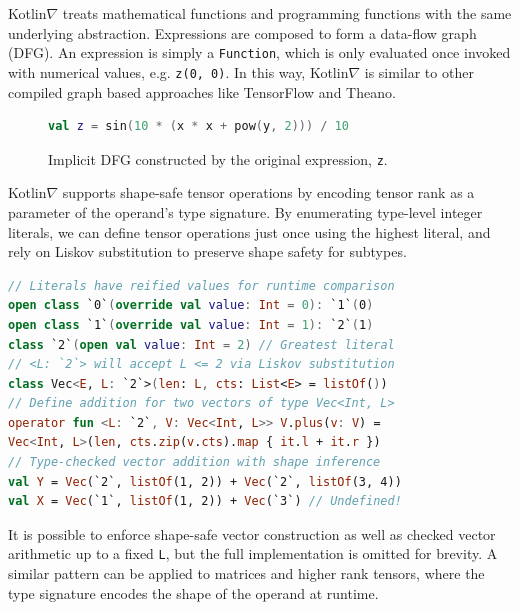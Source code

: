 \documentclass[12pt,initial,twoside,maitrise]{dms}
\numberwithin{equation}{section}
\numberwithin{table}{chapter}
\numberwithin{figure}{chapter}
\begin{document}
Kotlin$\nabla$ treats mathematical functions and programming functions with the same underlying abstraction. Expressions are composed to form a data-flow graph (DFG). An expression is simply a \texttt{Function}, which is only evaluated once invoked with numerical values, e.g. \texttt{z(0, 0)}. In this way, Kotlin$\nabla$ is similar to other compiled graph based approaches like TensorFlow and Theano.


\begin{figure}[!htb]
\begin{lstlisting}[caption={The equation below is an EDSL, and does not perform any computation.}, language=Kotlin]
val z = sin(10 * (x * x + pow(y, 2))) / 10
\end{lstlisting}
    \centering
    \caption{Implicit DFG constructed by the original expression, \texttt{z}.}
\end{figure}

Kotlin$\nabla$ supports shape-safe tensor operations by encoding tensor rank as a parameter of the operand's type signature. By enumerating type-level integer literals, we can define tensor operations just once using the highest literal, and rely on Liskov substitution to preserve shape safety for subtypes.

\begin{lstlisting}[caption={Shape safe tensor addition for rank-1 tensors, $\forall L\leq2.$}, language=Kotlin]
// Literals have reified values for runtime comparison
open class `0`(override val value: Int = 0): `1`(0)
open class `1`(override val value: Int = 1): `2`(1)
class `2`(open val value: Int = 2) // Greatest literal
// <L: `2`> will accept L <= 2 via Liskov substitution
class Vec<E, L: `2`>(len: L, cts: List<E> = listOf())
// Define addition for two vectors of type Vec<Int, L>
operator fun <L: `2`, V: Vec<Int, L>> V.plus(v: V) =
Vec<Int, L>(len, cts.zip(v.cts).map { it.l + it.r })
// Type-checked vector addition with shape inference
val Y = Vec(`2`, listOf(1, 2)) + Vec(`2`, listOf(3, 4))
val X = Vec(`1`, listOf(1, 2)) + Vec(`3`) // Undefined!
\end{lstlisting}

It is possible to enforce shape-safe vector construction as well as checked vector arithmetic up to a fixed \texttt{L}, but the full implementation is omitted for brevity. A similar pattern can be applied to matrices and higher rank tensors, where the type signature encodes the shape of the operand at runtime.
\end{document}
